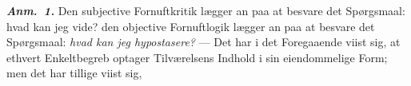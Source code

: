 \documentclass[12pt]{book}
\newcommand{\anm}[1]{\emph{\textbf{Anm.~#1.}}}
\newcommand{\opage}[1]{\marginnote{\footnotesize\textit{[#1]}}}
\begin{document}
\anm{1} Den subjective Fornuftkritik lægger an paa at besvare det Spørgsmaal: hvad kan
jeg vide? den objective Fornuftlogik lægger an paa at besvare det Spørgsmaal:
\emph{hvad kan jeg hypostasere?} --- Det har i det Foregaaende viist sig, at ethvert
Enkeltbegreb optager Tilværelsens Indhold i sin eiendommelige Form; men det har tillige
viist sig,
\opage{180} %
%
%
%
%
%
%
\end{document}
